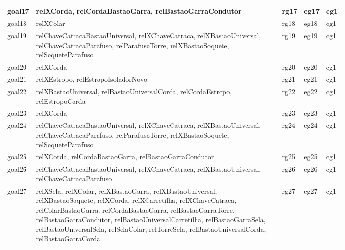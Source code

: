\documentclass[12pt]{article}
\begin{document}
\begin{table}[H]
\begin{tabular}{|l|p{0.8\linewidth}|l|l|l|}
goal17 & relXCorda, relCordaBastaoGarra, relBastaoGarraCondutor & rg17 & eg17 & cg1 \\ \hline
goal18 & relXColar & rg18 & eg18 & cg1 \\ \hline
goal19 & relChaveCatracaBastaoUniversal, relXChaveCatraca, relXBastaoUniversal, relChaveCatracaParafuso, relParafusoTorre, relXBastaoSoquete, relSoqueteParafuso & rg19 & eg19 & cg1 \\ \hline
goal20 & relXCorda & rg20 & eg20 & cg1 \\ \hline
goal21 & relXEstropo, relEstropoIsoladorNovo & rg21 & eg21 & cg1 \\ \hline
goal22 & relXBastaoUniversal, relBastaoUniversalCorda, relCordaEstropo, relEstropoCorda & rg22 & eg22 & cg1 \\ \hline
goal23 & relXCorda & rg23 & eg23 & cg1 \\ \hline
goal24 & relChaveCatracaBastaoUniversal, relXChaveCatraca, relXBastaoUniversal, relChaveCatracaParafuso, relParafusoTorre, relXBastaoSoquete, relSoqueteParafuso & rg24 & eg24 & cg1 \\ \hline
goal25 & relXCorda, relCordaBastaoGarra, relBastaoGarraCondutor & rg25 & eg25 & cg1 \\ \hline
goal26 & relChaveCatracaBastaoUniversal, relXChaveCatraca, relXBastaoUniversal, relChaveCatracaParafuso & rg26 & eg26 & cg1 \\ \hline
goal27 & relXSela, relXColar, relXBastaoGarra, relXBastaoUniversal, relXBastaoSoquete, relXCorda, relXCarretilha, relXChaveCatraca, relColarBastaoGarra, relCordaBastaoGarra, relBastaoGarraTorre, relBastaoGarraCondutor, relBastaoUniversalCarretilha, relBastaoGarraSela, relBastaoUniversalSela, relSelaColar, relTorreSela, relBastaoUniversalCorda, relBastaoGarraCorda & rg27 & eg27 & cg1 \\ \hline
\end{tabular}
\end{table}
\end{document}
